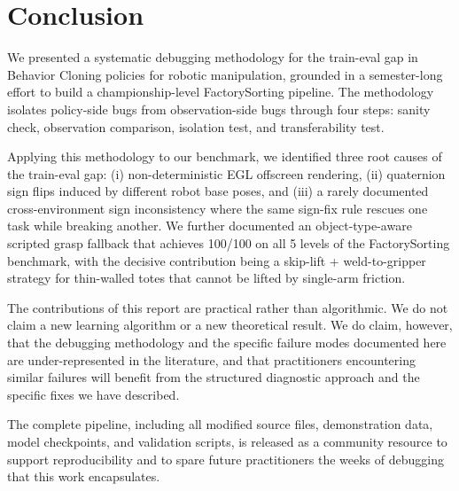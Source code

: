 \section{Conclusion}
\label{sec:conclusion}

We presented a systematic debugging methodology for the train-eval gap in Behavior Cloning policies for robotic manipulation, grounded in a semester-long effort to build a championship-level FactorySorting pipeline. The methodology isolates policy-side bugs from observation-side bugs through four steps: sanity check, observation comparison, isolation test, and transferability test.

Applying this methodology to our benchmark, we identified three root causes of the train-eval gap: (i) non-deterministic EGL offscreen rendering, (ii) quaternion sign flips induced by different robot base poses, and (iii) a rarely documented cross-environment sign inconsistency where the same sign-fix rule rescues one task while breaking another. We further documented an object-type-aware scripted grasp fallback that achieves 100/100 on all 5 levels of the FactorySorting benchmark, with the decisive contribution being a skip-lift + weld-to-gripper strategy for thin-walled totes that cannot be lifted by single-arm friction.

The contributions of this report are practical rather than algorithmic. We do not claim a new learning algorithm or a new theoretical result. We do claim, however, that the debugging methodology and the specific failure modes documented here are under-represented in the literature, and that practitioners encountering similar failures will benefit from the structured diagnostic approach and the specific fixes we have described.

The complete pipeline, including all modified source files, demonstration data, model checkpoints, and validation scripts, is released as a community resource to support reproducibility and to spare future practitioners the weeks of debugging that this work encapsulates.

